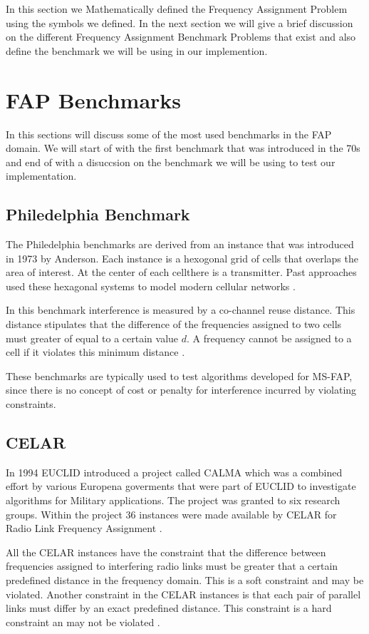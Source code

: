 In this section we Mathematically defined the Frequency Assignment Problem using the symbols we defined. In the next section we will give a brief discussion on the different Frequency Assignment Benchmark Problems that exist and also define the benchmark we will be using in our implemention.
\section{FAP Benchmarks}
\label{sec:FAPBenchmarks}
In this sections will discuss some of the most used benchmarks in the FAP domain. We will start of with the first benchmark that was introduced in the 70s and end of with a disuccsion on the benchmark we will be using to test our implementation.
\subsection{Philedelphia Benchmark}
The Philedelphia benchmarks are derived from an instance that was introduced in 1973 by Anderson. Each instance is a hexogonal grid of cells that overlaps the area of interest. At the center of each cellthere is a transmitter. Past approaches used these hexagonal systems to model modern cellular networks \cite{Karen2004,ExactMIFAP}.

In this benchmark interference is measured by a co-channel reuse distance. This distance stipulates that the difference of the frequencies  assigned to two cells must greater of equal to a certain value $d$. A frequency cannot be assigned to a cell if it violates this minimum distance \cite{Karen2004,ExactMIFAP}.

These benchmarks are typically used to test algorithms developed for MS-FAP, since there is no concept of cost or penalty for interference incurred by violating constraints.
\subsection{CELAR}
In 1994 EUCLID introduced a project called CALMA which was a combined effort by various Europena goverments that were part of EUCLID to investigate algorithms for Military applications. The project was granted to six research groups. Within the project 36 instances were made available by CELAR for Radio Link Frequency Assignment \cite{Karen2004,DynamicFAP}.

All the CELAR instances have the constraint that the difference between frequencies assigned to interfering radio links must be greater that a certain predefined distance in the frequency domain. This is a soft constraint and may be violated. Another constraint in the CELAR instances is that each pair of parallel links must differ by an exact predefined distance. This constraint is a hard constraint an may not be violated \cite{DynamicFAP}.

